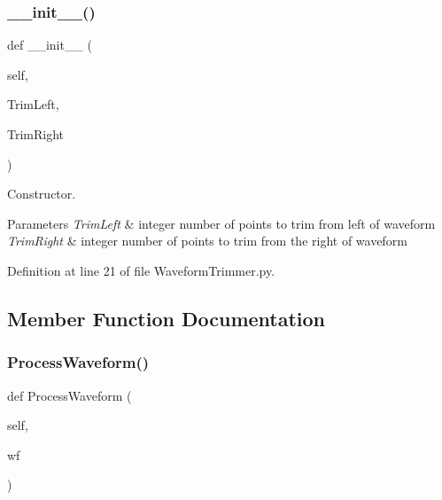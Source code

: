 \subsubsection{\texorpdfstring{\+\_\+\+\_\+init\+\_\+\+\_\+()}{\_\_init\_\_()}}
{\footnotesize\ttfamily def \+\_\+\+\_\+init\+\_\+\+\_\+ (\begin{DoxyParamCaption}\item[{}]{self,  }\item[{}]{Trim\+Left,  }\item[{}]{Trim\+Right }\end{DoxyParamCaption})}



Constructor. 


\begin{DoxyParams}{Parameters}
{\em Trim\+Left} & integer number of points to trim from left of waveform \\
\hline
{\em Trim\+Right} & integer number of points to trim from the right of waveform \\
\hline
\end{DoxyParams}


Definition at line 21 of file Waveform\+Trimmer.\+py.



\subsection{Member Function Documentation}
\mbox{\label{classSignalIntegrity_1_1TimeDomain_1_1Filters_1_1WaveformTrimmer_1_1WaveformTrimmer_ae09bec195c9cb1d5819e73b7be169b11}} 
\subsubsection{\texorpdfstring{Process\+Waveform()}{ProcessWaveform()}}
{\footnotesize\ttfamily def Process\+Waveform (\begin{DoxyParamCaption}\item[{}]{self,  }\item[{}]{wf }\end{DoxyParamCaption})}



